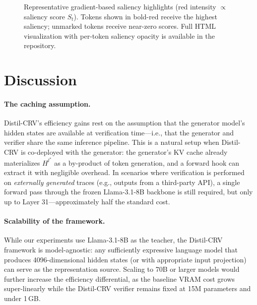 \documentclass{article}
\begin{document}
\begin{figure}[ht]
\centering
{}
\caption{Representative gradient-based saliency highlights (red intensity $\propto$ saliency score $S_t$). Tokens shown in bold-red receive the highest saliency; unmarked tokens receive near-zero scores. Full HTML visualization with per-token saliency opacity is available in the repository.}
\label{fig:saliency}
\end{figure}

\section{Discussion}
\label{sec:discussion}

\paragraph{The caching assumption.} Distil-CRV's efficiency gains rest on the assumption that the generator model's hidden states are available at verification time---i.e., that the generator and verifier share the same inference pipeline. This is a natural setup when Distil-CRV is co-deployed with the generator: the generator's KV cache already materializes $H^{l^*}$ as a by-product of token generation, and a forward hook can extract it with negligible overhead. In scenarios where verification is performed on \emph{externally generated} traces (e.g., outputs from a third-party API), a single forward pass through the frozen Llama-3.1-8B backbone is still required, but only up to Layer 31---approximately half the standard cost.

\paragraph{Scalability of the framework.} While our experiments use Llama-3.1-8B as the teacher, the Distil-CRV framework is model-agnostic: any sufficiently expressive language model that produces 4096-dimensional hidden states (or with appropriate input projection) can serve as the representation source. Scaling to 70B or larger models would further increase the efficiency differential, as the baseline VRAM cost grows super-linearly while the Distil-CRV verifier remains fixed at 15M parameters and under 1\,GB.
\end{document}
